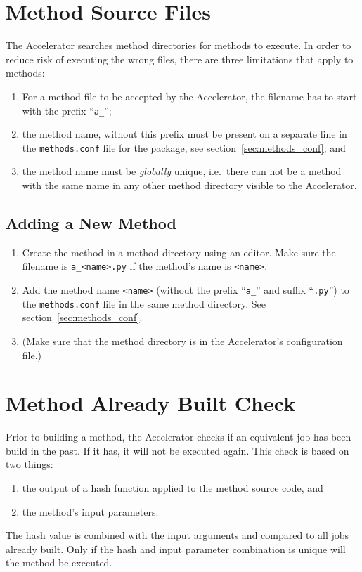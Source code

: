 \section{Method Source Files}

The Accelerator searches method directories for methods to execute.
In order to reduce risk of executing the wrong files, there are three
limitations that apply to methods:
\begin{enumerate}
\item For a method file to be accepted by the Accelerator, the
  filename has to start with the prefix ``\texttt{a\_}'';
\item the method name, without this prefix must be present on a
  separate line in the \texttt{methods.conf} file for the package, see
  section~\ref{sec:methods_conf}; and
\item the method name must be \emph{globally} unique, i.e.\ there can
  not be a method with the same name in any other method directory
  visible to the Accelerator.
\end{enumerate}


\subsection*{Adding a New Method}
\begin{enumerate}
  \item Create the method in a method directory using an editor.  Make
    sure the filename is \texttt{a\_<name>.py} if the method's name is
    \texttt{<name>}.
  \item Add the method name \texttt{<name>} (without the prefix ``\texttt{a\_}'' and
    suffix ``\texttt{.py}'') to the \texttt{methods.conf} file in the
    same method directory.  See section~\ref{sec:methods_conf}.
  \item (Make sure that the method directory is in the Accelerator's
    configuration file.)
\end{enumerate}


\section{Method Already Built Check}

Prior to building a method, the Accelerator checks if an equivalent
job has been build in the past.  If it has, it will not be executed
again.  This check is based on two things:
\begin{enumerate}
\item  the output of a hash function applied to the method source code, and
\item  the method's input parameters.
\end{enumerate}
The hash value is combined with the input arguments and compared to
all jobs already built.  Only if the hash and input parameter
combination is unique will the method be executed.

